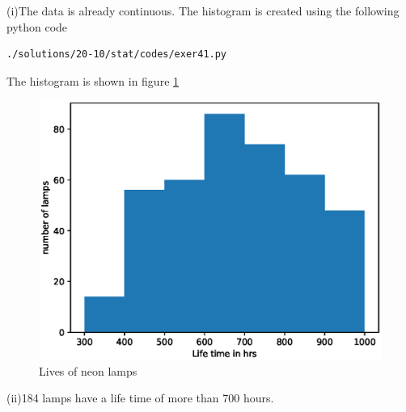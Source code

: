 (i)The data is already continuous. The histogram is created using the following python code\\
\begin{lstlisting}
./solutions/20-10/stat/codes/exer41.py
\end{lstlisting}
The histogram is shown in figure \ref{fig:hist41_py}
\begin{figure}[!ht]
\centering
\includegraphics[width=\columnwidth]{./solutions/20-10/stat/codes/pyfigs/exer41.eps}
\caption{Lives of neon lamps}
\label{fig:hist41_py}
\end{figure}
(ii)184 lamps have a life time of more than 700 hours.
